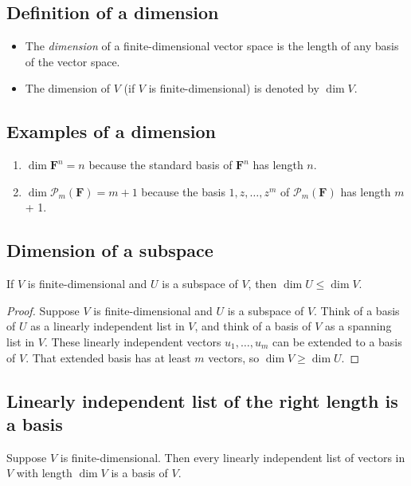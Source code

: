 \documentclass[11pt]{article}
\begin{document}
    \subsection{Definition of a dimension}

    \begin{itemize}
        \item The \emph{dimension} of a finite-dimensional vector space is the length of any basis of the vector space.
        \item The dimension of $V$ (if $V$ is finite-dimensional) is denoted by \(\dim V\).
    \end{itemize}

    \subsection{Examples of a dimension}

    \begin{enumerate}
        \item \(\dim \textbf{F}^n = n\) because the standard basis of \(\textbf{F}^n\) has length $n$.
        \item \(\dim \mathcal{P}_m(\textbf{F}) = m + 1\) because the basis \(1,z,\dots,z^m\) of \(\mathcal{P}_m(\textbf{F})\) has length $m$ + 1.
    \end{enumerate}

    \subsection{Dimension of a subspace}

    If $V$ is finite-dimensional and $U$ is a subspace of $V$, then \(\dim U \leq \dim V.\)

    \begin{proof}
        Suppose $V$ is finite-dimensional and $U$ is a subspace of $V$. Think of a basis of $U$ as a linearly independent list in $V$, and think of a basis of $V$ as a spanning list in $V$. These linearly independent vectors \(u_1, \dots, u_m\) can be extended to a basis of $V$. That extended basis has at least $m$ vectors, so \(\dim V \geq \dim U.\)
    \end{proof}

    \subsection{Linearly independent list of the right length is a basis}

    Suppose $V$ is finite-dimensional. Then every linearly independent list of vectors in $V$ with length \(\dim V\) is a basis of $V$.
\end{document}
